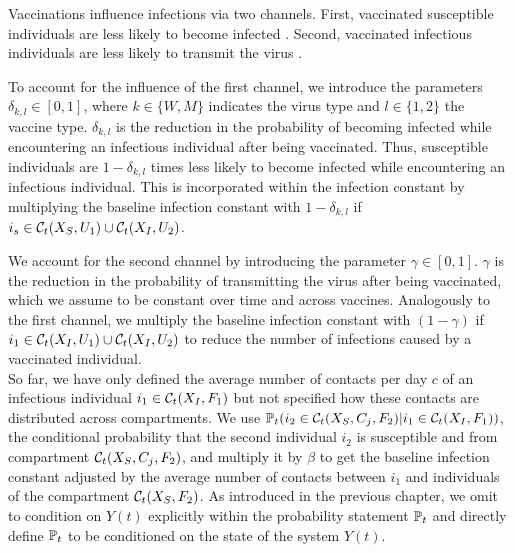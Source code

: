 Vaccinations influence infections via two channels. First, vaccinated susceptible individuals are less likely to become infected \citep{Callaway.2021}. Second, vaccinated infectious individuals are less likely to transmit the virus \citep{Harris.2021}.

To account for the influence of the first channel, we introduce the parameters $\delta_{k,l} \in [0,1]$, where $k \in \{W, M\}$ indicates the virus type and $l \in \{ 1,2\}$ the vaccine type. $\delta_{k,l}$ is the reduction in the probability of becoming infected while encountering an infectious individual after being vaccinated. Thus, susceptible individuals are $1 - \delta_{k,l}$ times less likely to become infected while encountering an infectious individual. This is incorporated within the infection constant by multiplying the baseline infection constant with $1 - \delta_{k,l}$ if $i_s \in \mathcal{C}_t(X_S, U_1) \cup \mathcal{C}_t(X_I, U_2)$.

We account for the second channel by introducing the parameter $\gamma \in [0,1]$. $\gamma$ is the reduction in the probability of transmitting the virus after being vaccinated, which we assume to be constant over time and across vaccines. Analogously to the first channel, we  multiply the baseline infection constant with $(1 - \gamma)$ if $i_1 \in \mathcal{C}_t(X_I, U_1) \cup \mathcal{C}_t(X_I, U_2)$ to reduce the number of infections caused by a vaccinated individual.  \\

So far, we have only defined the average number of contacts per day $c$ of an infectious individual $i_1 \in \mathcal{C}_t(X_I, F_1)$ but not specified how these contacts are distributed across compartments. We use $\mathbb{P}_t(i_2 \in \mathcal{C}_t(X_S, C_j, F_2) | i_1 \in \mathcal{C}_t(X_I, F_1))$, the conditional probability that the second individual $i_2$ is susceptible and from compartment $\mathcal{C}_t(X_S, C_j, F_2)$, and multiply it by $\beta$ to get the baseline infection constant adjusted by the average number of contacts between $i_1$ and individuals of the compartment $\mathcal{C}_t(X_S, F_2)$. As introduced in the previous chapter, we omit to condition on $Y(t)$ explicitly within the probability statement $\mathbb{P}_t$ and directly define $\mathbb{P}_t$ to be conditioned on the state of the system $Y(t)$.

